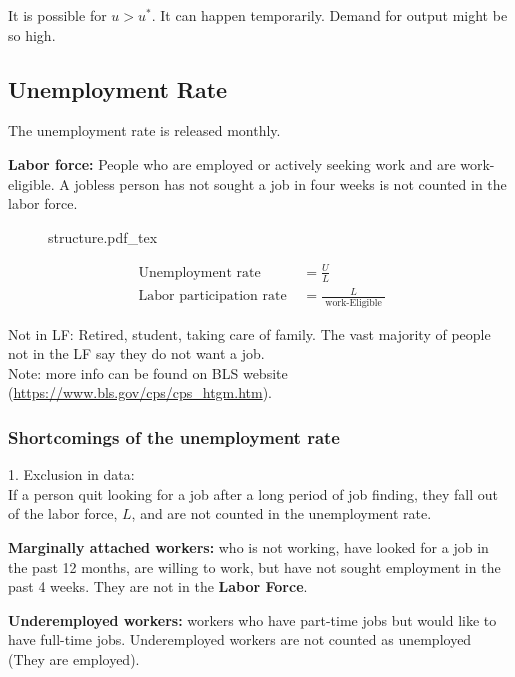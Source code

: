 \documentclass[12pt]{article}
\newcommand{\incfig}[1]{%
\def\svgwidth{\columnwidth}
{#1.pdf_tex}
}
\begin{document}
It is possible for $ u > u^{*} $. It can happen temporarily. Demand for output might
be so high.



\subsection{Unemployment Rate}
The unemployment rate is released monthly.


{\textbf {Labor force:}} People who are employed or actively seeking work and are
work-eligible. A jobless person has not sought a job in four weeks is not counted 
in the labor force.



\begin{figure}[ht]
    \centering
    \incfig{structure}
    \label{fig:structure}
\end{figure}


\begin{align*}
\text{ Unemployment rate } &= \frac{U}{L}  \\
\text{ Labor participation rate } &= \frac{L}{\text{ work-Eligible }} 
\end{align*}





Not in LF: Retired, student, taking care of family. The vast majority of people not in 
the LF say they do not want a job.\\
Note: more info can be found on BLS website
(\url{https://www.bls.gov/cps/cps_htgm.htm}).






\subsubsection{Shortcomings of the unemployment rate}
1. Exclusion in data:\\
If a person quit looking for a job after a long period of job finding, they fall
out of the labor force, $ L $, and are not counted in the unemployment rate.

{\textbf {Marginally attached workers:}} who is not working, have looked for a 
job in the past 12 months, are willing to work, but have not sought employment in the
past 4 weeks. They are not in the {\textbf {Labor Force}}.

{\textbf {Underemployed workers:}} workers who have part-time jobs but would like to
have full-time jobs. Underemployed workers are not counted as unemployed (They are
employed).
\end{document}
